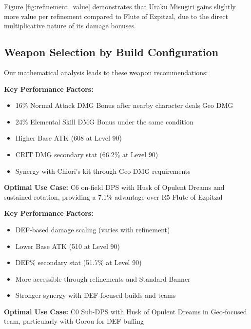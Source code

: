 \documentclass[12pt,a4paper]{article}
\begin{document}
Figure \ref{fig:refinement_value} demonstrates that Uraku Misugiri gains slightly more value per refinement compared to Flute of Ezpitzal, due to the direct multiplicative nature of its damage bonuses.

\subsection{Weapon Selection by Build Configuration}

Our mathematical analysis leads to these weapon recommendations:

\begin{tcolorbox}[colback=geodark!5, colframe=geodark, title=Uraku Misugiri (R1)]
\textbf{Key Performance Factors:}
\begin{itemize}
    \item 16\% Normal Attack DMG Bonus after nearby character deals Geo DMG
    \item 24\% Elemental Skill DMG Bonus under the same condition
    \item Higher Base ATK (608 at Level 90)
    \item CRIT DMG secondary stat (66.2\% at Level 90)
    \item Synergy with Chiori's kit through Geo DMG requirements
\end{itemize}

\textbf{Optimal Use Case:} C6 on-field DPS with Husk of Opulent Dreams and sustained rotation, providing a 7.1\% advantage over R5 Flute of Ezpitzal
\end{tcolorbox}

\begin{tcolorbox}[colback=geoyellow!5, colframe=geoyellow, title=Flute of Ezpitzal (R5)]
\textbf{Key Performance Factors:}
\begin{itemize}
    \item DEF-based damage scaling (varies with refinement)
    \item Lower Base ATK (510 at Level 90)
    \item DEF\% secondary stat (51.7\% at Level 90)
    \item More accessible through refinements and Standard Banner
    \item Stronger synergy with DEF-focused builds and teams
\end{itemize}

\textbf{Optimal Use Case:} C0 Sub-DPS with Husk of Opulent Dreams in Geo-focused team, particularly with Gorou for DEF buffing
\end{tcolorbox}
\end{document}
